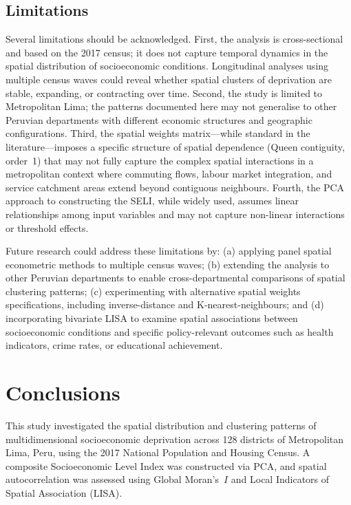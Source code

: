 \documentclass[12pt,a4paper,twoside]{article}
\begin{document}
\subsection{Limitations}

Several limitations should be acknowledged. First, the analysis is cross-sectional
and based on the 2017 census; it does not capture temporal dynamics in the spatial
distribution of socioeconomic conditions. Longitudinal analyses using multiple
census waves could reveal whether spatial clusters of deprivation are stable,
expanding, or contracting over time. Second, the study is limited to Metropolitan
Lima; the patterns documented here may not generalise to other Peruvian
departments with different economic structures and geographic configurations.
Third, the spatial weights matrix---while standard in the literature---imposes a
specific structure of spatial dependence (Queen contiguity, order~1) that may not
fully capture the complex spatial interactions in a metropolitan context where
commuting flows, labour market integration, and service catchment areas extend
beyond contiguous neighbours. Fourth, the PCA approach to constructing the SELI,
while widely used, assumes linear relationships among input variables and may
not capture non-linear interactions or threshold effects.

Future research could address these limitations by: (a) applying panel spatial
econometric methods to multiple census waves; (b) extending the analysis to
other Peruvian departments to enable cross-departmental comparisons of spatial
clustering patterns; (c) experimenting with alternative spatial weights
specifications, including inverse-distance and K-nearest-neighbours; and
(d) incorporating bivariate LISA to examine spatial associations between
socioeconomic conditions and specific policy-relevant outcomes such as health
indicators, crime rates, or educational achievement.

\section{Conclusions}

This study investigated the spatial distribution and clustering patterns of
multidimensional socioeconomic deprivation across 128 districts of Metropolitan
Lima, Peru, using the 2017 National Population and Housing Census. A composite
Socioeconomic Level Index was constructed via PCA, and spatial autocorrelation
was assessed using Global Moran's~$I$ and Local Indicators of Spatial
Association (LISA).
\end{document}
